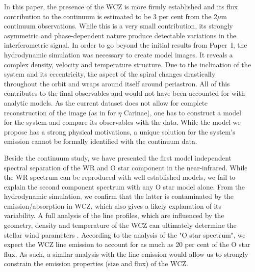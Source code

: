 \documentclass[usenatbib]{mnras}%
\begin{document}
In this paper, the presence of the WCZ is more firmly established and its flux contribution to the continuum is estimated to be 3 per cent from the 2$\mu$m continuum observations. While this is a very small contribution, its strongly asymmetric and phase-dependent nature produce detectable variations in the interferometric signal. In order to go beyond the initial results from Paper~I, the hydrodynamic simulation was necessary to create model images. It reveals a complex density, velocity and  temperature structure. Due to the inclination of the system and its eccentricity, the aspect of the spiral changes drastically throughout the orbit and wraps around itself around periastron.   All of this contributes to the final observables and would not have been accounted for with analytic models. As the current dataset does not allow for complete reconstruction of the image (as in \citet{2016A&A...594A.106W} for $\eta$ Carinae), one has to construct a model for the system and compare its observables with the data. While the model we propose has a strong physical motivations, a unique solution for the system's emission cannot be formally identified with the continuum data.

Beside the continuum study, we have presented the first model independent spectral separation of the WR and O star component in the near-infrared. While the WR spectrum can be reproduced with well established models, we fail to explain the second component spectrum with any O star model alone. From the hydrodynamic simulation, we confirm that the latter is contaminated by the emission/absorption in WCZ, which also gives a likely explanation of its variability.  A full analysis of the line profiles, which are influenced by the geometry, density and temperature of the WCZ can ultimately determine the stellar wind parameters \citep{2005MNRAS.356.1308H}. According to the analysis of the "O star spectrum", we expect the WCZ line emission to account for as much as 20 per cent of the O star flux. As such, a similar analysis with the line emission would allow us to strongly constrain the emission properties (size and flux) of the WCZ.   
\end{document}
